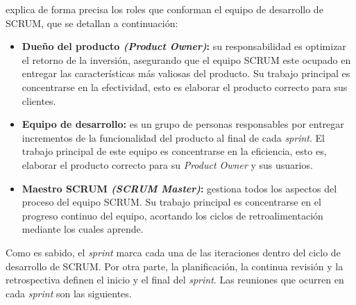  explica de forma precisa los roles que conforman el equipo de desarrollo de SCRUM, que se detallan a continuaci\'{o}n:
			
		\begin{itemize}
				
				\item \textbf{Due\~{n}o del producto \textit{(Product Owner)}:} su responsabilidad es optimizar el retorno de la inversi\'{o}n, asegurando que el equipo SCRUM este ocupado en entregar las caracter\'{i}sticas m\'{a}s valiosas del producto. Su trabajo principal es concentrarse en la efectividad, esto es elaborar el producto correcto para sus clientes.
				
				\item \textbf{Equipo de desarrollo:} es un grupo de personas responsables por entregar incrementos de la funcionalidad del producto al final de cada \textit{sprint}. El trabajo principal de este equipo es concentrarse en la eficiencia, esto es, elaborar el producto correcto para su \textit{Product Owner} y sus usuarios.
				
				\item \textbf{Maestro SCRUM \textit{(SCRUM Master)}:} gestiona todos los aspectos del proceso del equipo SCRUM. Su trabajo principal es concentrarse en el progreso continuo del equipo, acortando los ciclos de retroalimentaci\'{o}n mediante los cuales aprende.
				
		\end{itemize}
			
			Como es sabido, el \textit{sprint} marca cada una de las iteraciones dentro del ciclo de desarrollo de SCRUM. Por otra parte, la planificaci\'{o}n, la continua revisi\'{o}n y la retrospectiva definen el inicio y el final del \textit{sprint}. Las reuniones que ocurren en cada \textit{sprint} son las siguientes.
			
